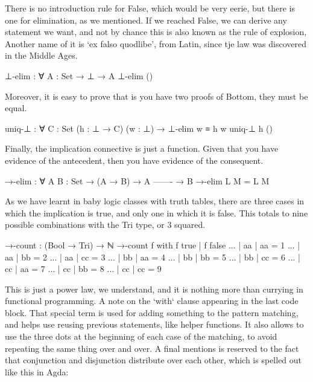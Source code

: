 \documentclass{lecturenotes}
\begin{document}
There is no introduction rule for False, which would be very eerie, but there is one for elimination, as we mentioned.
If we reached False, we can derive any statement we want, and not by chance this is also known as the rule of explosion,
Another name of it is `ex falso quodlibe', from Latin, since tje law  was discovered in the Middle Ages.

\begin{code}
⊥-elim : ∀ {A : Set}  → ⊥  → A
⊥-elim ()
\end{code}

Moreover, it is easy to prove that is you have two proofs of Bottom, they must be equal.

\begin{code}
uniq-⊥ : ∀ {C : Set} (h : ⊥ → C) (w : ⊥) → ⊥-elim w ≡ h w
uniq-⊥ h ()
\end{code}

Finally, the implication connective is just a function. Given that you have evidence of the antecedent, then you have evidence of the consequent. 

\begin{code}
→-elim : ∀ {A B : Set}
  → (A → B)
  → A
    -------
  → B
→-elim L M = L M
\end{code}

As we have learnt in baby logic classes with truth tables, there are three cases in which the implication is true, and only one in which it is false.
This totals to nine possible combinations with the Tri type, or 3 squared.

\begin{code}
→-count : (Bool → Tri) → ℕ
→-count f with f true | f false
...          | aa     | aa      =   1
...          | aa     | bb      =   2
...          | aa     | cc      =   3
...          | bb     | aa      =   4
...          | bb     | bb      =   5
...          | bb     | cc      =   6
...          | cc     | aa      =   7
...          | cc     | bb      =   8
...          | cc     | cc      =   9
\end{code}

This is just a power law, we understand, and it is nothing more than currying in functional programming. 
A note on the `with` clause appearing in the last code block.
That special term is used for adding something to the pattern matching, and helps use reusing previous statements, like helper functions.
It also allows to use the three dots at the beginning of each case of the matching, to avoid repeating the same thing over and over.
A final mentions is reserved to the fact that conjunction and disjunction distribute over each other, which is spelled out like this in Agda: 
\end{document}

